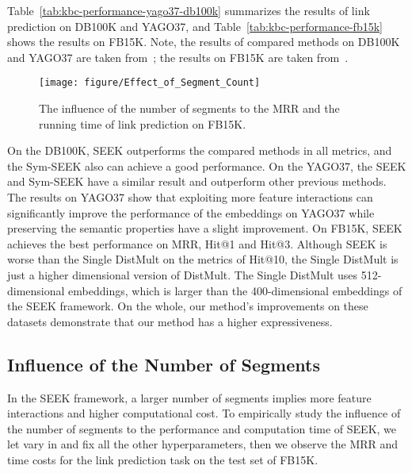 \documentclass[11pt,a4paper]{article}
\begin{document}
Table~\ref{tab:kbc-performance-yago37-db100k} summarizes the results of link prediction on DB100K and YAGO37, and Table~\ref{tab:kbc-performance-fb15k} shows the results on FB15K. Note, the results of compared methods on DB100K and YAGO37 are taken from~\cite{boyang2018:aer,guo2018:RUGE}; the results on FB15K are taken from~\cite{kadlec2017knowledge,boyang2018:aer,kazemi2018simple,sun2018rotate,DBLP:conf/acl/XuL19}.


\begin{figure}[!h]
	\centering
	\texttt{[image: figure/Effect\_of\_Segment\_Count]}
	\caption{The influence of the number of segments  to the MRR and the running time of link prediction on FB15K.}
	\label{fig:Seg_count}
\end{figure}

On the DB100K, SEEK outperforms the compared methods in all metrics, and the Sym-SEEK also can achieve a good performance. On the YAGO37, the SEEK and Sym-SEEK have a similar result and outperform other previous methods. The results on YAGO37 show that exploiting more feature interactions can significantly improve the performance of the embeddings on YAGO37 while preserving the semantic properties have a slight improvement. On FB15K, SEEK achieves the best performance on MRR, Hit@1 and Hit@3. 
Although SEEK is worse than the Single DistMult on the metrics of Hit@10, the Single DistMult is just a higher dimensional version of DistMult. The Single DistMult uses 512-dimensional embeddings, which is larger than the 400-dimensional embeddings of the SEEK framework. 
On the whole, our method's improvements on these datasets demonstrate that our method has a higher expressiveness.



\subsection{Influence of the Number of Segments }
In the SEEK framework, a larger number of segments  implies more feature interactions and higher computational cost. To empirically study the influence of the number of segments  to the performance and computation time of SEEK, we let  vary in  and fix all the other hyperparameters, then we observe the MRR and time costs for the link prediction task on the test set of FB15K. 
\end{document}
